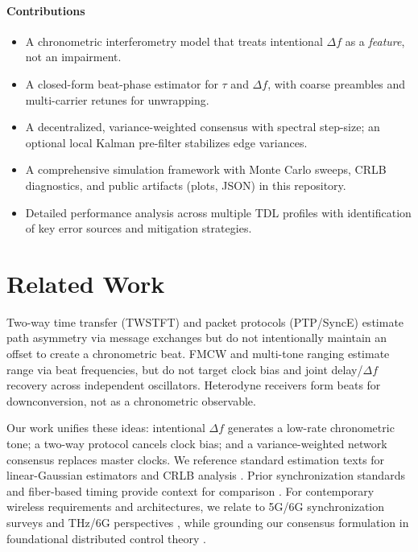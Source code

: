 \documentclass[10pt]{article}
\begin{document}
\paragraph{Contributions}
\begin{itemize}[leftmargin=*]
  \item A chronometric interferometry model that treats intentional \(\Delta f\) as a \emph{feature}, not an impairment.
  \item A closed-form beat-phase estimator for \(\tau\) and \(\Delta f\), with coarse preambles and multi-carrier retunes for unwrapping.
  \item A decentralized, variance-weighted consensus with spectral step-size; an optional local Kalman pre-filter stabilizes edge variances.
  \item A comprehensive simulation framework with Monte Carlo sweeps, CRLB diagnostics, and public artifacts (plots, JSON) in this repository.
  \item Detailed performance analysis across multiple TDL profiles with identification of key error sources and mitigation strategies.
\end{itemize}

\section{Related Work}
Two-way time transfer (TWSTFT) and packet protocols (PTP/SyncE) estimate path asymmetry via message exchanges but do not intentionally maintain an offset to create a chronometric beat. FMCW and multi-tone ranging estimate range via beat frequencies, but do not target clock bias and joint delay/\(\Delta f\) recovery across independent oscillators. Heterodyne receivers form beats for downconversion, not as a chronometric observable.

Our work unifies these ideas: intentional \(\Delta f\) generates a low-rate chronometric tone; a two-way protocol cancels clock bias; and a variance-weighted network consensus replaces master clocks. We reference standard estimation texts for linear-Gaussian estimators and CRLB analysis \citep{KaySSP}. Prior synchronization standards and fiber-based timing provide context for comparison \citep{IEEE1588,WhiteRabbit,TWSTFT}. For contemporary wireless requirements and architectures, we relate to 5G/6G synchronization surveys \citep{deSena2020WirelessSync5G} and THz/6G perspectives \citep{Akyildiz2022THz6G}, while grounding our consensus formulation in foundational distributed control theory \citep{OlfatiSaber2007Consensus}.
\end{document}
